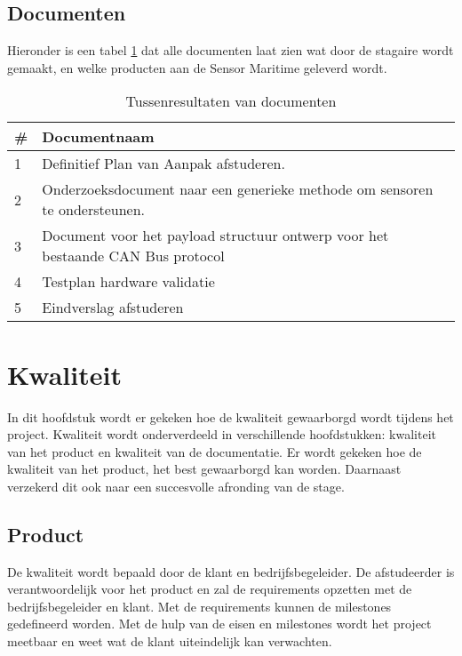 \subsection{Documenten}
Hieronder is een tabel \ref{tab:documents} dat alle documenten laat zien wat door de stagaire wordt gemaakt, en welke producten aan de Sensor Maritime geleverd wordt.
\begin{table}[h!] 
	\caption{Tussenresultaten van documenten}
	\begin{tabular}{p{1cm}p{14cm}}
	\toprule
	\textbf{\#} & \textbf{Documentnaam}   \\ \midrule
	1 & Definitief Plan van Aanpak afstuderen. \\
	2 & Onderzoeksdocument naar een generieke methode om sensoren te ondersteunen. \\
	3 & Document voor het payload structuur ontwerp voor het bestaande CAN Bus protocol \\
	4 & Testplan hardware validatie \\
	5 & Eindverslag afstuderen \\ \bottomrule
	\end{tabular}

\label{tab:documents}
\end{table}

\newpage
\section{Kwaliteit}
In dit hoofdstuk wordt er gekeken hoe de kwaliteit gewaarborgd wordt tijdens het project. Kwaliteit wordt onderverdeeld in verschillende hoofdstukken: kwaliteit van het product en kwaliteit van de documentatie. Er wordt gekeken hoe de kwaliteit van het product, het best gewaarborgd kan worden. Daarnaast verzekerd dit ook naar een succesvolle afronding van de stage.

\subsection{Product}
De kwaliteit wordt bepaald door de klant en bedrijfsbegeleider. De afstudeerder is verantwoordelijk voor het product en zal de requirements opzetten met de bedrijfsbegeleider en klant. Met de requirements kunnen de milestones gedefineerd worden. Met de hulp van de eisen en milestones wordt het project meetbaar en weet wat de klant uiteindelijk kan verwachten. \newline

